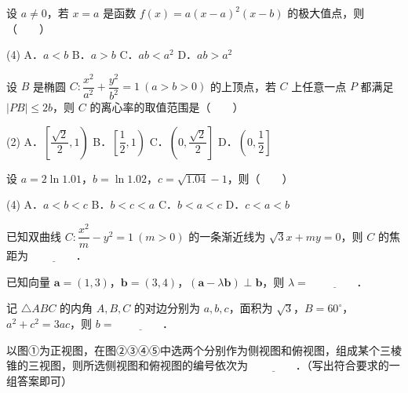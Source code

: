\begin{question}
设 $a\ne0$，若 $x=a$ 是函数 $f(x)=a(x-a)^2(x-b)$ 的极大值点，则\mbox{（　　）}

\begin{gkopts}(4)
\task A．$a<b$
\task B．$a>b$
\task C．$ab<a^2$
\task D．$ab>a^2$
\end{gkopts}

\end{question}
\begin{question}
设 $B$ 是椭圆 $C:\dfrac{x^2}{a^2}+\dfrac{y^2}{b^2}=1\ (a>b>0)$ 的上顶点，若 $C$ 上任意一点 $P$ 都满足 $|PB|\leqslant2b$，则 $C$ 的离心率的取值范围是\mbox{（　　）}

\begin{gkopts}(2)
\task A．$\left[\dfrac{\sqrt2}{2},1\right)$
\task B．$\left[\dfrac12,1\right)$
\task C．$\left(0,\dfrac{\sqrt2}{2}\right]$
\task D．$\left(0,\dfrac12\right]$
\end{gkopts}

\end{question}
\begin{question}
设 $a=2\ln1.01$，$b=\ln1.02$，$c=\sqrt{1.04}-1$，则\mbox{（　　）}

\begin{gkopts}(4)
\task A．$a<b<c$
\task B．$b<c<a$
\task C．$b<a<c$
\task D．$c<a<b$
\end{gkopts}

\par\medskip

\end{question}

\begin{question}
已知双曲线 $C:\dfrac{x^2}{m}-y^2=1\ (m>0)$ 的一条渐近线为 $\sqrt3x+my=0$，则 $C$ 的焦距为 $\underline{\qquad\qquad}$．

\end{question}
\begin{question}
已知向量 $\boldsymbol a=(1,3)$，$\boldsymbol b=(3,4)$，$(\boldsymbol a-\lambda\boldsymbol b)\perp\boldsymbol b$，则 $\lambda=$ $\underline{\qquad\qquad}$．

\end{question}
\begin{question}
记 $\triangle ABC$ 的内角 $A,B,C$ 的对边分别为 $a,b,c$，面积为 $\sqrt3$，$B=60^\circ$，$a^2+c^2=3ac$，则 $b=$ $\underline{\qquad\qquad}$．

\Needspace{0.4\textheight}
\end{question}
\begin{question}
以图①为正视图，在图②③④⑤中选两个分别作为侧视图和俯视图，组成某个三棱锥的三视图，则所选侧视图和俯视图的编号依次为 $\underline{\qquad\qquad}$．（写出符合要求的一组答案即可）
\nopagebreak[4]
\begin{center}\end{center}
\nopagebreak[4]
\par\medskip

\end{question}

